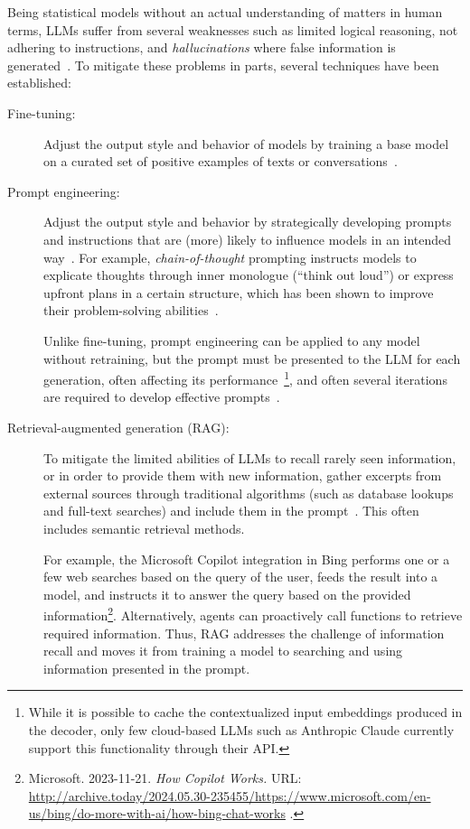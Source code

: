 Being statistical models without an actual understanding of matters in human terms, LLMs suffer from several weaknesses such as limited logical reasoning, not adhering to instructions, and \emph{hallucinations} where false information is generated~\cite{openai2024gpt4}.
To mitigate these problems in parts, several techniques have been established:
%
\begin{description}
	\item[Fine-tuning:] Adjust the output style and behavior of models by training a base model on a curated set of positive examples of texts or conversations~\cite{kojima2022large,wei2022finetuned}.

	\item[Prompt engineering:] Adjust the output style and behavior by strategically developing prompts and instructions that are (more) likely to influence models in an intended way~\cite{white2023prompt}.
	For example, \emph{chain-of-thought} prompting instructs models to explicate thoughts through inner monologue (``think out loud'') or express upfront plans in a certain structure, which has been shown to improve their problem-solving abilities~\cite{wei2023chainofthought}.

	Unlike fine-tuning, prompt engineering can be applied to any model without retraining, but the prompt must be presented to the LLM for each generation, often affecting its performance~\cite{zhao2023survey}\footnote{While it is possible to cache the contextualized input embeddings produced in the decoder, only few cloud-based LLMs such as Anthropic Claude currently support this functionality through their API.}, and often several iterations are required to develop effective prompts~\cite{white2023prompt}.

	\item[Retrieval-augmented generation (RAG):] To mitigate the limited abilities of LLMs to recall rarely seen information, or in order to provide them with new information, gather excerpts from external sources through traditional algorithms (such as database lookups and full-text searches) and include them in the prompt~\cite{lewis2020retrieval}.
	This often includes semantic retrieval methods.

	For example, the Microsoft Copilot integration in Bing performs one or a few web searches based on the query of the user, feeds the result into a \gptfouro model, and instructs it to answer the query based on the provided information\footnote{
		Microsoft. 2023-11-21. \emph{How Copilot Works.}
		URL:
		\url{http://archive.today/2024.05.30-235455/https://www.microsoft.com/en-us/bing/do-more-with-ai/how-bing-chat-works}%
		.
	}.
	Alternatively, agents can proactively call functions to retrieve required information.
	Thus, RAG addresses the challenge of information recall and moves it from training a model to searching and using information presented in the prompt.
\end{description}

